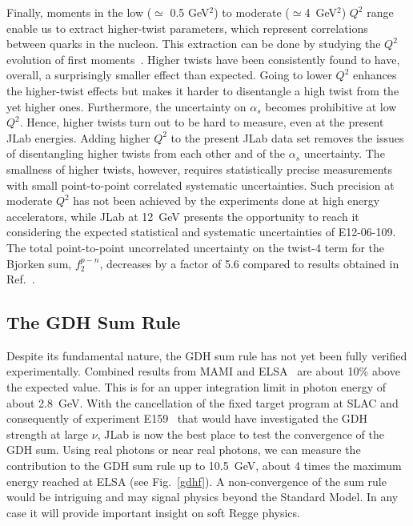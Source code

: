 Finally, moments in the low ($\simeq$ 0.5 GeV$^2$) to moderate 
($\simeq$4~GeV$^2$) $Q^2$ range enable us to extract higher-twist parameters,
which represent correlations between quarks in the nucleon.  This extraction 
can be done by studying the $Q^2$ evolution of first moments~\cite{Chen:2005td}.
Higher twists have been consistently found to have, overall, a surprisingly 
smaller effect than expected.  Going to lower $Q^2$ enhances the higher-twist 
effects but makes it harder to disentangle a high twist from the yet higher 
ones.  Furthermore, the uncertainty on $\alpha _s$ becomes prohibitive at low 
$Q^2$.  Hence, higher twists turn out to be hard to measure, even at the 
present JLab energies.  Adding higher $Q^2$ to the present JLab data set 
removes the issues of disentangling higher twists from each other and of the 
$\alpha _s$ uncertainty.  The smallness of higher twists, however, requires 
statistically precise measurements with small point-to-point correlated 
systematic uncertainties.  Such precision at moderate $Q^2$ has not been 
achieved by the experiments done at high energy accelerators, while JLab at 
12~GeV presents the opportunity to reach it considering the expected 
statistical and systematic uncertainties of E12-06-109.  The total 
point-to-point uncorrelated uncertainty on the twist-4 term for the Bjorken 
sum, $f_2^{p-n}$, decreases by a factor of 5.6 compared to results obtained in
Ref.~\cite{Deur:2004ti}. 

\subsection{The GDH Sum Rule}

Despite its fundamental nature, the GDH sum rule has not yet been fully 
verified experimentally.  Combined results from MAMI and ELSA~\cite{GDH04}
are about 10\% above the expected value.  This is for an upper integration 
limit in photon energy of about 2.8~GeV.  With the cancellation of the fixed 
target program at SLAC and consequently of experiment E159~\cite{SLACGDH} that 
would have investigated the GDH strength at large $\nu$, JLab is now the best 
place to test the convergence of the GDH sum.  Using real photons or 
near real photons, we can measure the contribution to the GDH sum rule up to 
10.5~GeV, about 4 times the maximum energy reached at ELSA (see 
Fig.~\ref{gdhf}).  A non-convergence of the sum rule would be intriguing 
and may signal physics beyond the Standard Model.  In any case it will provide 
important insight on soft Regge physics.

